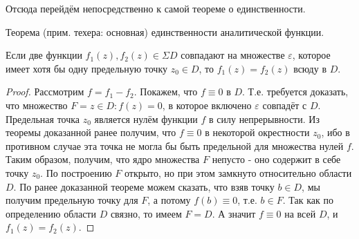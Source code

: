 Отсюда перейдём непосредственно к самой теореме о единственности. 

\begin{theorem*}
	Теорема (прим. техера: основная) единственности аналитической функции.
	
	Если две функции $f_1(z), f_2(z) \in \Sigma D$ совпадают на множестве $\varepsilon$, которое имеет хотя бы одну предельную точку $z_0 \in D$, то $f_1(z) = f_2(z)$ всюду в $D$.
\end{theorem*}

\begin{proof}
	Рассмотрим $f = f_1 - f_2$. Покажем, что $f \equiv 0$ в $D$. Т.е. требуется доказать, что множество $F = {z\in D: f(z) = 0}$, в которое включено $\varepsilon$ совпадёт с $D$. Предельная точка $z_0$ является нулём функции $f$ в силу непрерывности. Из теоремы доказанной ранее получим, что $f \equiv 0$ в некоторой окрестности $z_0$, ибо в противном случае эта точка не могла бы быть предельной для множества нулей $f$. Таким образом, получим, что ядро множества $F$ непусто - оно содержит в себе точку $z_0$. По построению $F$ открыто, но при этом замкнуто относительно области $D$. По ранее доказанной теореме можем сказать, что взяв точку $b \in D$, мы получим предельную точку для $F$, а потому $f(b) \equiv 0$, т.е. $b \in F$. Так как по определению области $D$ связно, то имеем $F = D$. А значит $f \equiv 0$ на всей $D$, и $f_1(z) = f_2(z)$.
\end{proof}
